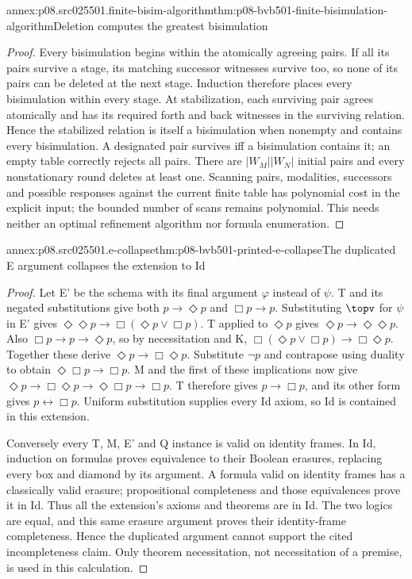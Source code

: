 \begin{annexitem}{annex:p08.src025501.finite-bisim-algorithm}{thm:p08-bvb501-finite-bisimulation-algorithm}{Deletion computes the greatest bisimulation}
\begin{proof}
Every bisimulation begins within the atomically agreeing pairs. If all
its pairs survive a stage, its matching successor witnesses survive
too, so none of its pairs can be deleted at the next stage. Induction
therefore places every bisimulation within every stage. At stabilization,
each surviving pair agrees atomically and has its required forth and
back witnesses in the surviving relation. Hence the stabilized relation
is itself a bisimulation when nonempty and contains every bisimulation.
A designated pair survives iff a bisimulation contains it; an empty
table correctly rejects all pairs. There are \(|W_M||W_N|\)
initial pairs and every nonstationary round deletes at least one.
Scanning pairs, modalities, successors and possible responses against
the current finite table has polynomial cost in the explicit input;
the bounded number of scans remains polynomial. This needs neither
an optimal refinement algorithm nor formula enumeration.
\end{proof}
\end{annexitem}

\begin{annexitem}{annex:p08.src025501.e-collapse}{thm:p08-bvb501-printed-e-collapse}{The duplicated E argument collapses the extension to Id}
\begin{proof}
Let E' be the schema with its final argument \(\varphi\) instead
of \(\psi\). T and its negated substitutions give both
\(p\to\Diamond p\) and \(\Box p\to p\). Substituting
\(\topv\) for \(\psi\) in E' gives
\(\Diamond\Diamond p\to\Box(\Diamond p\lor\Box p)\).
T applied to \(\Diamond p\) gives
\(\Diamond p\to\Diamond\Diamond p\). Also
\(\Box p\to p\to\Diamond p\), so by necessitation and K,
\(\Box(\Diamond p\lor\Box p)\to\Box\Diamond p\).
Together these derive \(\Diamond p\to\Box\Diamond p\).
Substitute \(\neg p\) and contrapose using duality to obtain
\(\Diamond\Box p\to\Box p\). M and the first of these
implications now give
\(\Diamond p\to\Box\Diamond p\to\Diamond\Box p\to\Box p\).
T therefore gives \(p\to\Box p\), and its other form gives
\(p\leftrightarrow\Box p\). Uniform substitution supplies every
Id axiom, so Id is contained in this extension.

Conversely every T, M, E' and Q instance is valid on identity frames.
In Id, induction on formulas proves equivalence to their Boolean
erasures, replacing every box and diamond by its argument. A formula
valid on identity frames has a classically valid erasure; propositional
completeness and those equivalences prove it in Id. Thus all the
extension's axioms and theorems are in Id. The two logics are equal,
and this same erasure argument proves their identity-frame completeness.
Hence the duplicated argument cannot support the cited incompleteness
claim. Only theorem necessitation, not necessitation of a premise,
is used in this calculation.
\end{proof}
\end{annexitem}

